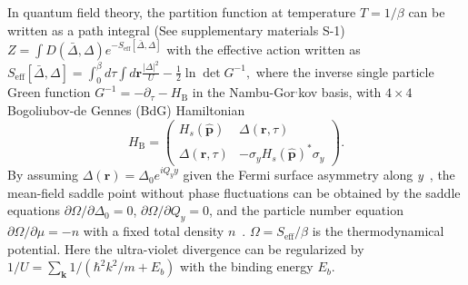 \documentclass[prl,aps,twocolumn,showpacs, floatfix]{revtex4}
\begin{document}
In quantum field theory, the partition function at temperature $T=1/\beta $
can be written as a path integral (See supplementary materials S-1) $Z=\int
D(\bar{\Delta},\Delta )e^{-S_{\mathrm{eff}}[\bar{\Delta},\Delta ]}$ with the
effective action written as $S_{\mathrm{eff}}[\bar{\Delta},\Delta
]=\int_{0}^{\beta }d\tau \int d\mathbf{r}\frac{|\Delta |^{2}}{U}-\frac{1}{2}%
\ln \det {G}^{-1},$ where the inverse single particle Green function $%
G^{-1}=-\partial _{\tau }-H_{\mathrm{B}}$ in the Nambu-Gor$^{,}$kov basis,
with $4\times 4$ Bogoliubov-de Gennes (BdG) Hamiltonian%
\begin{equation}
H_{\mathrm{B}}=\left(
\begin{array}{cc}
H_{s}(\hat{\mathbf{p}}) & \Delta (\mathbf{r},\tau ) \\
\Delta (\mathbf{r},\tau ) & -\sigma _{y}H_{s}(\hat{\mathbf{p}})^{\ast
}\sigma _{y}%
\end{array}%
\right) .
\end{equation}%
By assuming $\Delta (\mathbf{r})=\Delta _{0}e^{iQ_{y}y}$ given the Fermi
surface asymmetry along \textit{y}~\cite{YongArx13}, the mean-field
saddle point without phase fluctuations can be obtained by the saddle
equations $\partial \Omega /\partial \Delta _{0}=0$, $\partial \Omega
/\partial Q_{y}=0$, and the particle number equation $\partial \Omega
/\partial \mu =-n$ with a fixed total density $n$~\cite{Yong2014PRL}. $%
\Omega =S_{\mathrm{eff}}/\beta $ is the thermodynamical potential. Here the
ultra-violet divergence can be regularized by $1/U=\sum_{\mathbf{k}}1/(\hbar
^{2}k^{2}/m+E_{b})$ with the binding energy $E_{b}$.
\end{document}
